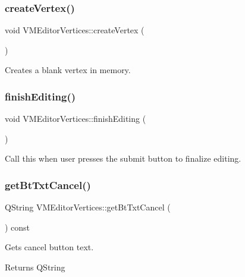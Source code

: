 \subsubsection{\texorpdfstring{createVertex()}{createVertex()}}
{\footnotesize\ttfamily void V\+M\+Editor\+Vertices\+::create\+Vertex (\begin{DoxyParamCaption}{ }\end{DoxyParamCaption})}



Creates a blank vertex in memory. 

\mbox{\label{class_v_m_editor_vertices_a3dafad61c61cfd7b90d2e1651daa79be}} 
\subsubsection{\texorpdfstring{finishEditing()}{finishEditing()}}
{\footnotesize\ttfamily void V\+M\+Editor\+Vertices\+::finish\+Editing (\begin{DoxyParamCaption}{ }\end{DoxyParamCaption})}



Call this when user presses the submit button to finalize editing. 

\mbox{\label{class_v_m_editor_vertices_a0db2a882a7334d63902bbb5e93745efe}} 
\subsubsection{\texorpdfstring{getBtTxtCancel()}{getBtTxtCancel()}}
{\footnotesize\ttfamily Q\+String V\+M\+Editor\+Vertices\+::get\+Bt\+Txt\+Cancel (\begin{DoxyParamCaption}{ }\end{DoxyParamCaption}) const}



Gets cancel button text. 

\begin{DoxyReturn}{Returns}
Q\+String 
\end{DoxyReturn}
\mbox{\label{class_v_m_editor_vertices_added9bc98a3854b9639ea4f1e4c58e25}} 
